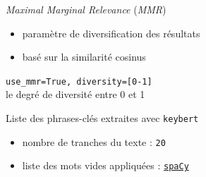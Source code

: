\begin{frame}{\textit{Maximal Marginal Relevance} (\textit{\textsc{MMR}})}
\pause
\begin{itemize}[<+->]
\item paramètre de diversification des résultats
\item basé sur la similarité cosinus
\end{itemize}
\pause
\bigskip
\texttt{use\_mmr=True, diversity=[0-1]} \\
\pause \hspace{2.77cm} {\footnotesize le degré de diversité entre 0 et 1}
\end{frame}

\begin{frame}{Liste des phrases-clés extraites avec \texttt{keybert}}
\pause
\begin{itemize}
\item nombre de tranches du texte : \texttt{20}
\pause
\item liste des mots vides appliquées : \href{https://spacy.io/}{\texttt{spaCy}} 
\end{itemize}


\end{frame}

